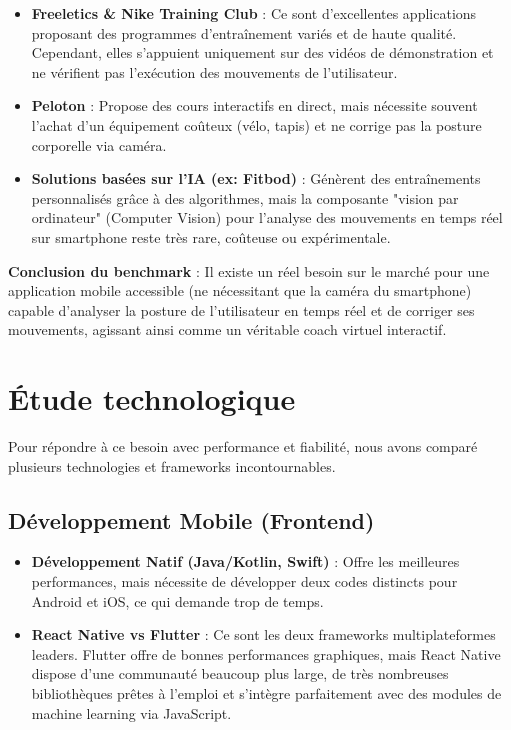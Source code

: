 \begin{itemize}
    \item \textbf{Freeletics \& Nike Training Club} : Ce sont d'excellentes applications proposant des programmes d'entraînement variés et de haute qualité. Cependant, elles s'appuient uniquement sur des vidéos de démonstration et ne vérifient pas l'exécution des mouvements de l'utilisateur.
    \item \textbf{Peloton} : Propose des cours interactifs en direct, mais nécessite souvent l'achat d'un équipement coûteux (vélo, tapis) et ne corrige pas la posture corporelle via caméra.
    \item \textbf{Solutions basées sur l'IA (ex: Fitbod)} : Génèrent des entraînements personnalisés grâce à des algorithmes, mais la composante "vision par ordinateur" (Computer Vision) pour l'analyse des mouvements en temps réel sur smartphone reste très rare, coûteuse ou expérimentale.
\end{itemize}

\textbf{Conclusion du benchmark} : Il existe un réel besoin sur le marché pour une application mobile accessible (ne nécessitant que la caméra du smartphone) capable d'analyser la posture de l'utilisateur en temps réel et de corriger ses mouvements, agissant ainsi comme un véritable coach virtuel interactif.

\section{Étude technologique}
Pour répondre à ce besoin avec performance et fiabilité, nous avons comparé plusieurs technologies et frameworks incontournables.

\subsection{Développement Mobile (Frontend)}
\begin{itemize}
    \item \textbf{Développement Natif (Java/Kotlin, Swift)} : Offre les meilleures performances, mais nécessite de développer deux codes distincts pour Android et iOS, ce qui demande trop de temps.
    \item \textbf{React Native vs Flutter} : Ce sont les deux frameworks multiplateformes leaders. Flutter offre de bonnes performances graphiques, mais React Native dispose d'une communauté beaucoup plus large, de très nombreuses bibliothèques prêtes à l'emploi et s'intègre parfaitement avec des modules de machine learning via JavaScript.
\end{itemize}

